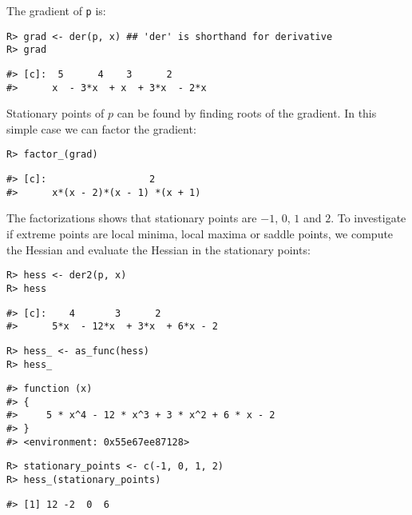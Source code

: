 The gradient of \texttt{p} is:

\begin{verbatim}
R> grad <- der(p, x) ## 'der' is shorthand for derivative
R> grad
\end{verbatim}

\begin{verbatim}
#> [c]:  5      4    3      2      
#>      x  - 3*x  + x  + 3*x  - 2*x
\end{verbatim}

Stationary points of \(p\) can be found by finding roots of the gradient. In this simple case we can factor the gradient:

\begin{verbatim}
R> factor_(grad)
\end{verbatim}

\begin{verbatim}
#> [c]:                  2        
#>      x*(x - 2)*(x - 1) *(x + 1)
\end{verbatim}

The factorizations shows that stationary points are \(-1\), \(0\), \(1\) and \(2\). To
investigate if extreme points are local minima, local maxima or saddle
points, we compute the Hessian and evaluate the Hessian in the
stationary points:

\begin{verbatim}
R> hess <- der2(p, x)
R> hess
\end{verbatim}

\begin{verbatim}
#> [c]:    4       3      2          
#>      5*x  - 12*x  + 3*x  + 6*x - 2
\end{verbatim}

\begin{verbatim}
R> hess_ <- as_func(hess)
R> hess_
\end{verbatim}

\begin{verbatim}
#> function (x) 
#> {
#>     5 * x^4 - 12 * x^3 + 3 * x^2 + 6 * x - 2
#> }
#> <environment: 0x55e67ee87128>
\end{verbatim}

\begin{verbatim}
R> stationary_points <- c(-1, 0, 1, 2)
R> hess_(stationary_points)
\end{verbatim}

\begin{verbatim}
#> [1] 12 -2  0  6
\end{verbatim}

